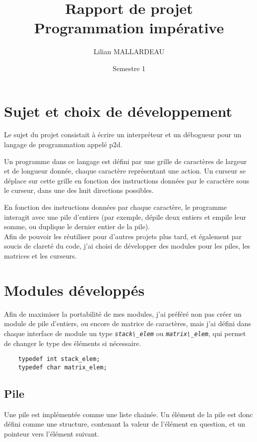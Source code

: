 \documentclass[a4paper,11pt]{article}
\title{Rapport de projet\\Programmation impérative}
\author{Lilian MALLARDEAU}
\date{Semestre 1}
\newcommand{\code}[1]{{\textit{\lstinline{#1}}}}
\begin{document}
\maketitle
\tableofcontents
\break

\section*{Sujet et choix de développement}

Le sujet du projet consistait à écrire un interpréteur et un débogueur pour un langage de programmation appelé p2d.

Un programme dans ce langage est défini par une grille de caractères de largeur et de longueur donnée, chaque caractère représentant une action.
Un curseur se déplace sur cette grille en fonction des instructions données par le caractère sous le curseur, dans une des huit directions possibles.

En fonction des instructions données par chaque caractère, le programme interagit avec une pile d'entiers (par exemple, dépile deux entiers et empile leur somme, ou duplique le dernier entier de la pile).
\\

Afin de pouvoir les réutiliser pour d'autres projets plus tard, et également par soucis de clareté du code, j'ai choisi de développer des modules pour les piles, les matrices et les curseurs.


\section*{Modules développés}
Afin de maximiser la portabilité de mes modules, j'ai préféré non pas créer un module de pile d'entiers, ou encore de matrice de caractères, mais j'ai défini dans chaque interface de module un type \code{stack\_elem} ou \code{matrix\_elem}, qui permet de changer le type des éléments si nécessaire.

\begin{lstlisting}
    typedef int stack_elem;
    typedef char matrix_elem;
\end{lstlisting}

\subsection*{Pile}
Une pile est implémentée comme une liste chainée. Un élément de la pile est donc défini comme une structure, contenant la valeur de l'élément en question, et un pointeur vers l'élément suivant.
\end{document}
